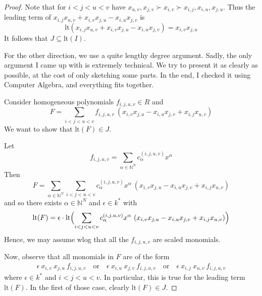 \documentclass{scrartcl}
\newcommand{\N}{\mathbb{N}}
\theoremstyle{definition}
\begin{document}
\begin{proof}
    Note that for $i < j < u < v$ have $x_{u, v}, x_{j, v} \succ x_{i, v} \succ x_{i, j}, x_{i, u}, x_{j, u}$.
    Thus the leading term of $x_{i, j} x_{u, v} + x_{i, v} x_{j, u} - x_{i, u} x_{j, v}$ is
    \begin{equation*}
        \mathrm{lt}(x_{i, j} x_{u, v} + x_{i, v} x_{j, u} - x_{i, u} x_{j, v}) = x_{i, v} x_{j, u}
    \end{equation*}
    It follows that $J \subseteq \mathrm{lt}(I)$.

    For the other direction, we use a quite lengthy degree argument.
    Sadly, the only argument I came up with is extremely technical.
    We try to present it as clearly as possible, at the cost of only sketching some parts.
    In the end, I checked it using Computer Algebra, and everything fits together.

    Consider homogeneous polynomials $f_{i, j, u, v} \in R$ and
    \begin{equation*}
        F = \sum_{i < j < u < v} f_{i, j, u, v} \ (x_{i, v} x_{j, u} - x_{i, u} x_{j, v} + x_{i, j} x_{u, v})
    \end{equation*}
    We want to show that $\mathrm{lt}(F) \in J$.
    
    Let
    \begin{equation*}
        f_{i, j, u, v} = \sum_{\alpha \in \N^N} c^{(i, j, u, v)}_\alpha x^\alpha
    \end{equation*}
    Then
    \begin{equation*}
        F = \sum_{\alpha \in \N^N} \sum_{i < j < u < v} c^{(i, j, u, v)}_\alpha x^\alpha \ (x_{i, v} x_{j, u} - x_{i, u} x_{j, v} + x_{i, j} x_{u, v})
    \end{equation*}
    and so there exists $\alpha \in \N^N$ and $\epsilon \in k^*$ with
    \begin{equation*}
        \mathrm{lt}(F) = \epsilon \cdot \mathrm{lt}\Bigl( \sum_{i < j < u < v} c_\alpha^{(i, j, u, v)} x^\alpha \ (x_{i, v} x_{j, u} - x_{i, u} x_{j, v} + x_{i, j} x_{u, v}) \Bigr)
    \end{equation*}
    Hence, we may assume wlog that all the $f_{i, j, u, v}$ are scaled monomials.

    Now, observe that all monomials in $F$ are of the form
    \begin{align*}
        \epsilon \ x_{i, v} \ x_{j, u} \ f_{i, j, u, v} \quad \text{or} \quad 
        \epsilon \ x_{i, u} \ x_{j, v} \ f_{i, j, u, v} \quad \text{or} \quad 
        \epsilon \ x_{i, j} \ x_{u, v} \ f_{i, j, u, v} 
    \end{align*}
    where $\epsilon \in k^*$ and $i < j < u < v$.
    In particular, this is true for the leading term $\mathrm{lt}(F)$.
    In the first of those case, clearly $\mathrm{lt}(F) \in J$.


\end{proof}
\end{document}
